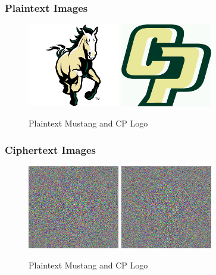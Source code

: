 \documentclass[11pt]{article}
\begin{document}
  \pagebreak
  \subsubsection{Plaintext Images}
    \begin{figure}[h!]
      \centering
      \includegraphics[width=4cm]{Images/mustang.jpg}
      \includegraphics[width=4cm]{Images/cp-logo.jpg}
      \caption{Plaintext Mustang and CP Logo}
      \label{fig:Plaintext_Images}
    \end{figure}


  \subsubsection{Ciphertext Images}
    \begin{figure}[!h]
      \centering
      \includegraphics[width=4cm]{Images/mustang_cipher.jpg}
      \includegraphics[width=4cm]{Images/cp_cipher.jpg}
      \caption{Plaintext Mustang and CP Logo}
      \label{fig:Ciphertext_Images}
    \end{figure}
\end{document}
